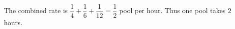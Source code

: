 The combined rate is $\dfrac{1}{4}+\dfrac{1}{6}+\dfrac{1}{12}=\dfrac{1}{2}$ pool per hour. Thus one pool takes $\boxed2$ hours.
